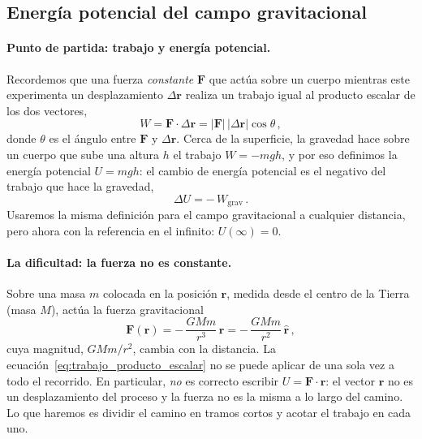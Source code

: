 
\subsection{Energía potencial del campo gravitacional}
\label{subsec:energia_potencial_gravitacional}

\paragraph{Punto de partida: trabajo y energía potencial.}
Recordemos que una fuerza \emph{constante} $\boldsymbol{F}$ que actúa sobre un
cuerpo mientras este experimenta un desplazamiento $\Delta\boldsymbol{r}$
realiza un trabajo igual al producto escalar de los dos vectores,
\begin{equation}
  W = \boldsymbol{F}\cdot\Delta\boldsymbol{r}
    = \lvert\boldsymbol{F}\rvert\,\lvert\Delta\boldsymbol{r}\rvert\cos\theta \,,
  \label{eq:trabajo_producto_escalar}
\end{equation}
donde $\theta$ es el ángulo entre $\boldsymbol{F}$ y $\Delta\boldsymbol{r}$.
Cerca de la superficie, la gravedad hace sobre un cuerpo que sube una altura
$h$ el trabajo $W = -mgh$, y por eso definimos la energía potencial $U = mgh$: el
cambio de energía potencial es el negativo del trabajo que hace la gravedad,
\begin{equation}
  \Delta U = -\,W_{\text{grav}} \,.
  \label{eq:def_cambio_epot}
\end{equation}
Usaremos la misma definición para el campo gravitacional a cualquier
distancia, pero ahora con la referencia en el infinito:
$U(\infty) = 0$.

\paragraph{La dificultad: la fuerza no es constante.}
Sobre una masa $m$ colocada en la posición $\boldsymbol{r}$, medida desde el
centro de la Tierra (masa $M$), actúa la fuerza gravitacional
\begin{equation}
  \boldsymbol{F}(\boldsymbol{r})
  = -\,\frac{GMm}{r^{3}}\,\boldsymbol{r}
  = -\,\frac{GMm}{r^{2}}\,\hat{\boldsymbol{r}} \,,
  \label{eq:fuerza_grav_epot}
\end{equation}
cuya magnitud, $GMm/r^{2}$, cambia con la distancia. La
ecuación~\eqref{eq:trabajo_producto_escalar} no se puede aplicar de una sola
vez a todo el recorrido. En particular, \emph{no} es correcto escribir
$U = \boldsymbol{F}\cdot\boldsymbol{r}$: el vector
$\boldsymbol{r}$ no es un desplazamiento del proceso y la fuerza no es la
misma a lo largo del camino. Lo que haremos es dividir el camino en tramos
cortos y acotar el trabajo en cada uno.

